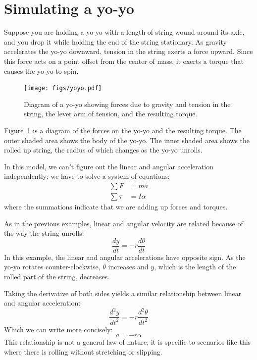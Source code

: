 \documentclass[12pt]{book}
\theoremstyle{exercise}
\begin{document}
\section{Simulating a yo-yo}

Suppose you are holding a yo-yo with a length of string wound around its axle, and you drop it while holding the end of the string stationary.  As gravity accelerates the yo-yo downward, tension in the string exerts a force upward.  Since this force acts on a point offset from the center of mass, it exerts a torque that causes the yo-yo to spin.


\begin{figure}
\centerline{\texttt{[image: figs/yoyo.pdf]}}
\caption{Diagram of a yo-yo showing forces due to gravity and tension in the string, the lever arm of tension, and the resulting torque.}
\label{yoyo}
\end{figure}

Figure~\ref{yoyo} is a diagram of the forces on the yo-yo and the resulting torque.  The outer shaded area shows the body of the yo-yo.  The inner shaded area shows the rolled up string, the radius of which changes as the yo-yo unrolls.


In this model, we can't figure out the linear and angular acceleration independently; we have to solve a system of equations:
%
\begin{align*}
\sum F &= m a \\
\sum \tau &= I \alpha
\end{align*}
%
where the summations indicate that we are adding up forces and torques.

As in the previous examples, linear and angular velocity are related because of the way the string unrolls:
%
\[ \frac{dy}{dt} = -r \frac{d \theta}{dt} \]
%
In this example, the linear and angular accelerations have opposite sign.  As the yo-yo rotates counter-clockwise, $\theta$ increases and $y$, which is the length of the rolled part of the string, decreases.

Taking the derivative of both sides yields a similar relationship between linear and angular acceleration:
%
\[ \frac{d^2 y}{dt^2} = -r \frac{d^2 \theta}{dt^2} \]
%
Which we can write more concisely:
%
\[ a = -r \alpha \]
%
This relationship is not a general law of nature; it is specific to scenarios like this where there is rolling without stretching or slipping.
\end{document}
